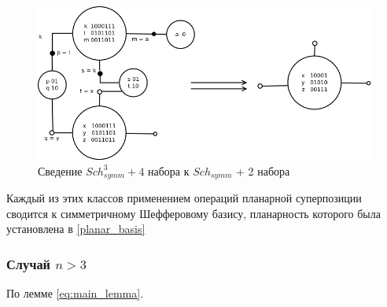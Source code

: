 \documentclass[12pt]{article}
\begin{document}
\begin{itemize}
\begin{figure}[htb]
\centering
\includegraphics[width=1.0\textwidth]{3_4to3_2.png}
\caption{Сведение $Sch_{symm}^3 + 4$ набора к $Sch_{symm}$ + 2 набора}
\label{fig:3_4to3_2}
\end{figure}
\end{itemize}

Каждый из этих классов применением операций планарной суперпозиции сводится к 
симметричному Шефферовому базису, планарность которого была установлена в \ref{planar_basis}

\subsubsection{Случай $n > 3$}
По лемме \ref{eq:main_lemma}.


\end{document}
